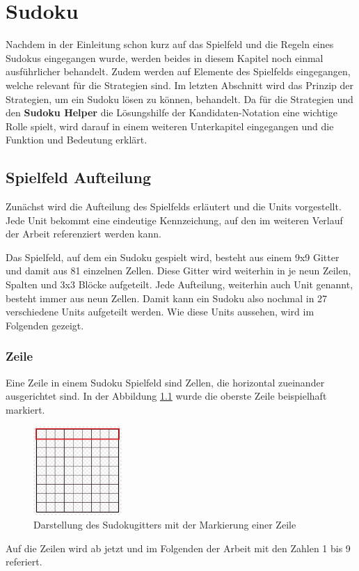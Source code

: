 

\chapter{Sudoku}
Nachdem in der Einleitung schon kurz auf das Spielfeld und die Regeln eines Sudokus eingegangen wurde, werden beides in diesem Kapitel noch einmal ausführlicher behandelt. Zudem werden auf Elemente des Spielfelds eingegangen, welche relevant für die Strategien sind. Im letzten Abschnitt wird das Prinzip der Strategien, um ein Sudoku lösen zu können, behandelt. Da für die Strategien und den \textbf{Sudoku Helper} die Lösungshilfe der Kandidaten-Notation eine wichtige Rolle spielt, wird darauf in einem weiteren Unterkapitel eingegangen und die Funktion und Bedeutung erklärt.



\section{Spielfeld Aufteilung}
Zunächst wird die Aufteilung des Spielfelds erläutert und die Units vorgestellt. Jede Unit bekommt eine eindeutige Kennzeichung, auf den im weiteren Verlauf der Arbeit referenziert werden kann.

Das Spielfeld, auf dem ein Sudoku gespielt wird, besteht aus einem 9x9 Gitter und damit aus 81 einzelnen Zellen. Diese Gitter wird weiterhin in je neun Zeilen, Spalten und 3x3 Blöcke aufgeteilt. Jede Aufteilung, weiterhin auch Unit genannt, besteht immer aus neun Zellen. Damit kann ein Sudoku also nochmal in 27 verschiedene Units aufgeteilt werden. Wie diese Units aussehen, wird im Folgenden gezeigt. \cite{sudopedia_2022}

\subsection{Zeile}
Eine Zeile in einem Sudoku Spielfeld sind Zellen, die horizontal zueinander ausgerichtet sind. In der Abbildung \ref{fig:SudokugitterZeile} wurde die oberste Zeile beispielhaft markiert.
\begin{figure}[H]
	\centering
	\includegraphics[width=0.3\textwidth]{images/sudokugitterZeile.jpg}
	\caption{Darstellung des Sudokugitters mit der Markierung einer Zeile}
	\label{fig:SudokugitterZeile}
\end{figure}
Auf die Zeilen wird ab jetzt und im Folgenden der Arbeit mit den Zahlen 1 bis 9 referiert. 

